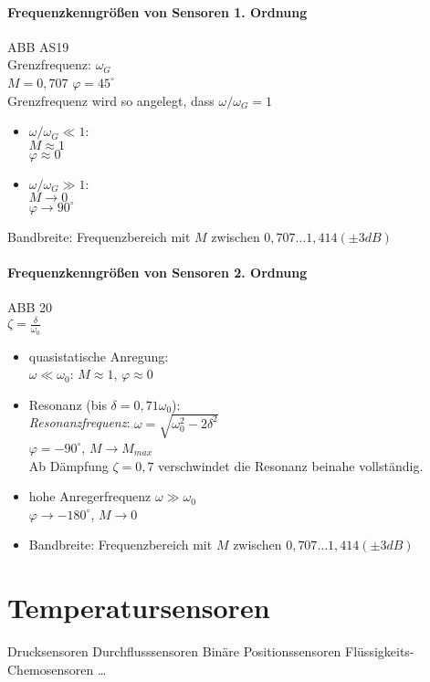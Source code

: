 \subsubsection{Frequenzkenngrößen von Sensoren 1. Ordnung}
ABB AS19\\
Grenzfrequenz: $\omega_G$\\
$M=0,707$ \quad $\varphi=45^\circ$\\
Grenzfrequenz wird so angelegt, dass $\omega/\omega_G=1$
\begin{itemize}
\item $\omega/\omega_G \ll 1$:\\
$M \approx 1$\\
$\varphi \approx 0$
\item $\omega / \omega_G \gg 1$:\\
$M \to 0$\\
$\varphi \to 90^\circ$
\end{itemize}
Bandbreite: Frequenzbereich mit $M$ zwischen $0,707\dots 1,414 (\pm 3dB)$

\subsubsection{Frequenzkenngrößen von Sensoren 2. Ordnung}
ABB 20\\
$\zeta = \frac{\delta}{\omega_0}$
\begin{itemize}
\item quasistatische Anregung:\\
$\omega \ll \omega_0$: $M\approx 1$, $\varphi \approx 0$
\item Resonanz (bis $\delta = 0,71 \omega_0$):\\
\emph{Resonanzfrequenz}: $\omega = \sqrt{\omega_0^2-2\delta^2}$\\
$\varphi = -90^\circ$, $M\to M_{max}$\\
Ab Dämpfung $\zeta = 0,7$ verschwindet die Resonanz beinahe vollständig.
\item hohe Anregerfrequenz $\omega \gg \omega_0$\\
$\varphi \to -180^\circ$, $M\to 0$
\item Bandbreite: Frequenzbereich mit $M$ zwischen $0,707\dots 1,414 (\pm 3dB)$
\end{itemize}

\chapter{Temperatursensoren}
Drucksensoren
Durchflusssensoren
Binäre Positionssensoren
Flüssigkeits-Chemosensoren
…
